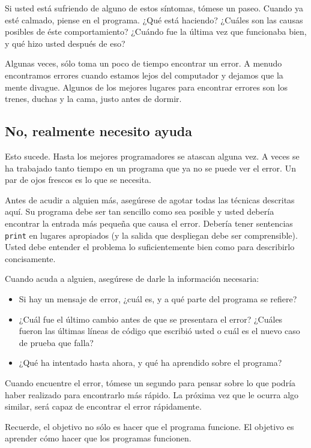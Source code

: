 Si usted está sufriendo de alguno de estos síntomas, tómese un 
paseo. Cuando ya esté calmado, piense en el programa. ¿Qué está
haciendo? ¿Cuáles son las causas posibles de éste comportamiento?
¿Cuándo fue la última vez que funcionaba bien, y qué hizo usted
después de eso?

Algunas veces, sólo toma un poco de tiempo encontrar un error.
A menudo encontramos errores cuando estamos lejos del computador
y dejamos que la mente divague. Algunos de los mejores lugares
para encontrar errores son los trenes, duchas y la cama, 
justo antes de dormir.


\subsection{No, realmente necesito ayuda}

Esto sucede. Hasta los mejores programadores se atascan alguna
vez. A veces se ha trabajado tanto tiempo en un programa que ya no se 
puede ver el error. Un par de ojos frescos es lo que se necesita.

Antes de acudir a alguien más, asegúrese de agotar todas las
técnicas descritas aquí. Su programa debe ser tan sencillo como
sea posible y usted debería encontrar la entrada más pequeña 
que causa el error. Debería tener sentencias  \texttt{print} en
lugares apropiados (y la salida que despliegan debe ser
comprensible).  Usted debe entender el problema lo suficientemente
bien como para describirlo concisamente.

Cuando acuda a alguien, asegúrese de darle la información necesaria:


\begin{itemize}

\item Si hay un mensaje de error, ¿cuál es, y a qué parte del 
programa se refiere?
 
\item ¿Cuál fue el último cambio antes de que se presentara
el error? 
¿Cuáles fueron las últimas líneas de código que escribió usted
 o cuál es el nuevo caso de prueba que falla?

\item ¿Qué ha intentado hasta ahora, y qué ha aprendido sobre
el programa?

\end{itemize}

Cuando encuentre el error, tómese un segundo para pensar sobre
lo que podría haber realizado para encontrarlo más rápido. La
próxima vez que le ocurra algo similar, será capaz de encontrar 
el error rápidamente.

Recuerde, el objetivo no sólo es hacer que el programa funcione.
 El objetivo es aprender cómo hacer que los programas funcionen.
